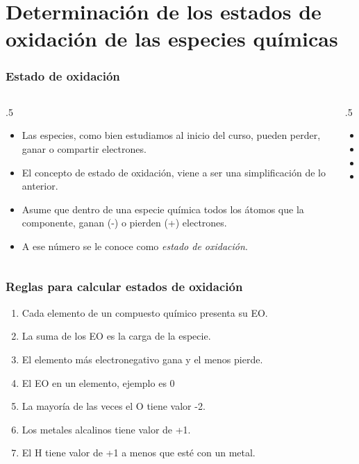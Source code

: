\documentclass[11pt, aspectratio=169, xcolor=table]{beamer}
\begin{document}
\section{Determinación de los estados de oxidación de las especies químicas}

\begin{frame}[allowdisplaybreaks]
	\frametitle{Estado de oxidación}
	\begin{columns}
		\begin{column}{.5\textwidth}
			\begin{itemize}
				\item Las especies, como bien estudiamos al inicio del curso, pueden perder, ganar o compartir electrones.
				\item El concepto de estado de oxidación, viene a ser una simplificación de lo anterior.
				\item Asume que dentro de una especie química todos los átomos que la componente, ganan (-) o pierden (+) electrones.
				\item A ese número se le conoce como \textit{estado de oxidación}.
			\end{itemize}
		\end{column}

		\begin{column}{.5\textwidth}
			\begin{itemize}
				\item {}
				\item {}
				\item {}
				\item {}
			\end{itemize}
		\end{column}
	\end{columns}

\end{frame}

\begin{frame}[allowdisplaybreaks]
	\frametitle{Reglas para calcular estados de oxidación}
	\begin{enumerate}
		\item Cada elemento de un compuesto químico presenta su EO.
		\item La suma de los EO es la carga de la especie.
		\item El elemento más electronegativo gana y el menos pierde.
		\item El EO en un elemento, ejemplo  es 0
		\item La mayoría de las veces el O tiene valor -2.
		\item Los metales alcalinos tiene valor de +1.
		\item El H tiene valor de +1 a menos que esté con un metal.
	\end{enumerate}
\end{frame}
\end{document}
